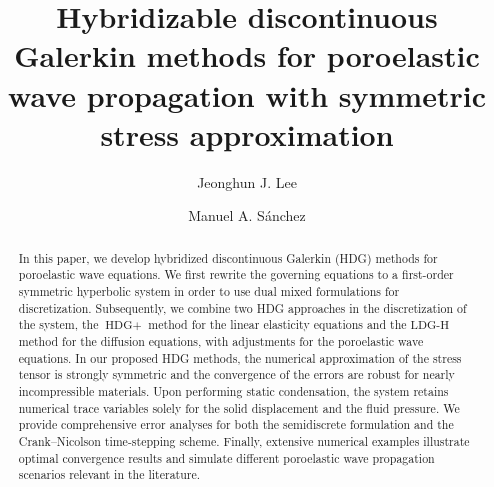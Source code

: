 \documentclass[10pt,letterpaper]{amsart}
\title[HDG for poroelastic wave propagation]{Hybridizable discontinuous Galerkin methods for poroelastic wave propagation with symmetric stress approximation}
\author{Jeonghun J. Lee}
\author{Manuel A. S\'anchez}
\theoremstyle{plain} %
\theoremstyle{remark} %
\begin{document}

%

\maketitle



\begin{abstract}
    In this paper, we develop hybridized discontinuous Galerkin (HDG) methods for poroelastic wave equations. We first rewrite the governing equations to a first-order symmetric hyperbolic system in order to use dual mixed formulations for discretization. Subsequently, we combine two HDG approaches in the discretization of the system, the $\text{HDG}+$ method for the linear elasticity equations and the $\text{LDG-H}$ method for the diffusion equations, with adjustments for the poroelastic wave equations. In our proposed HDG methods, the numerical approximation of the stress tensor is strongly symmetric and the convergence of the errors are robust for nearly incompressible materials. Upon performing static condensation, the system retains numerical trace variables solely for the solid displacement and the fluid pressure. We provide comprehensive error analyses for both the semidiscrete formulation and the Crank--Nicolson time-stepping scheme. Finally, extensive numerical examples illustrate  optimal convergence results and simulate different poroelastic wave propagation scenarios relevant in the literature.
\end{abstract}
\end{document}
